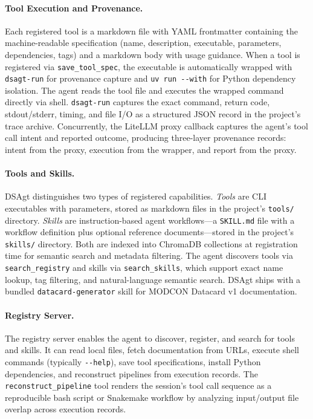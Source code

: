 \documentclass[11pt]{article}
\begin{document}
\paragraph{Tool Execution and Provenance.}
Each registered tool is a markdown file with YAML frontmatter
containing the machine-readable specification (name,
description, executable, parameters, dependencies, tags) and
a markdown body with usage guidance.
When a tool is registered via \texttt{save\_tool\_spec}, the
executable is automatically wrapped with \texttt{dsagt-run}
for provenance capture and \texttt{uv run -{}-with} for
Python dependency isolation.
The agent reads the tool file and executes the wrapped command
directly via shell.
\texttt{dsagt-run} captures the exact command, return code,
stdout/stderr, timing, and file I/O as a structured JSON
record in the project's trace archive.
Concurrently, the LiteLLM proxy callback captures the agent's
tool call intent and reported outcome, producing three-layer
provenance records: intent from the proxy, execution from the
wrapper, and report from the proxy.

\paragraph{Tools and Skills.}
DSAgt distinguishes two types of registered capabilities.
\emph{Tools} are CLI executables with parameters, stored as
markdown files in the project's \texttt{tools/} directory.
\emph{Skills} are instruction-based agent workflows---a
\texttt{SKILL.md} file with a workflow definition plus
optional reference documents---stored in the project's
\texttt{skills/} directory.
Both are indexed into ChromaDB collections at registration
time for semantic search and metadata filtering.
The agent discovers tools via \texttt{search\_registry}
and skills via \texttt{search\_skills}, which support exact
name lookup, tag filtering, and natural-language semantic
search.
DSAgt ships with a bundled \texttt{datacard-generator} skill
for MODCON Datacard v1 documentation.

\paragraph{Registry Server.}
The registry server enables the agent to discover, register,
and search for tools and skills.
It can read local files, fetch documentation from URLs,
execute shell commands (typically \texttt{-{}-help}), save
tool specifications, install Python dependencies, and
reconstruct pipelines from execution records.
The \texttt{reconstruct\_pipeline} tool renders the session's
tool call sequence as a reproducible bash script or Snakemake
workflow by analyzing input/output file overlap across
execution records.
\end{document}
